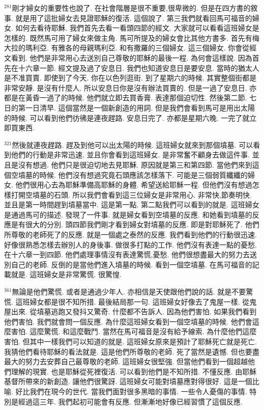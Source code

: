 \documentclass{book}
\begin{document}
$^{281}$剛才婦女的重要性也說了.
在社會階層是很不重要,很卑微的.
但是在四方書的敘事.
就是用了這批婦女去見證耶穌的復活.
這個說了.
第三我們就看回馬可福音的婦女.
如何去看待耶穌.
我們首先去看一看頭四節的經文.
大家就可以看看這班婦女是怎樣的.
既然馬可用了婦女來做主角.
馬可所提及的婦女會比其他方書多.
首先有梅大拉的瑪利亞.
有雅各的母親瑪利亞.
和有撒羅的三個婦女.
這三個婦女.
你會從經文看到.
他們是非常用心去送別自己尊敬的耶穌的最後一程.
為何會這樣說.
因為首先在十六章一節.
經文提及過了安息日.
我們也知道安息日是要安息.
當時的猶太人是不准買賣.
即使到了今天.
你在以色列逛街.
到了星期六的時候.
其實整個街都是非常安靜.
是沒有什麼人.
所以安息日你是沒有辦法買賣的.
但是一過了安息日.
亦都是在黃昏一過了的時候.
他們就立即去買香膏.
表達那個迫切性.
然後第二節.
七日的第一日清早.
這個當然是一個新創造的用詞.
但是我們會看到馬可是用出太陽的時候.
可以看到他們彷彿是連夜趕路.
安息日完了.
亦都是星期六晚.
一完了就立即買東西.

$^{321}$然後就連夜趕路.
趕及到他可以出太陽的時候.
這班婦女就來到那個墳墓.
可以看到他們的行動是非常迅速.
並且你會看到這班婦女.
是非常奮不顧身去做這件事.
並且是沒有想過.
他們只是很迫切地去見耶穌.
原因就是第三和第四節.
當他們來到這個空墳墓的時候.
他們沒有想過究竟石頭應該怎樣落下.
可能是三個弱質纖纖的婦女.
他們很用心去為耶穌準備高耶穌的身體.
希望送給耶穌一程.
但他們沒有想過怎樣打開空墳墓的石頭.
所以我們會看到這三位婦女是非常用心.
非常快,節奏明快.
並且是第一時間趕到墳墓當中.
這是第一點.
第二點我們可以看到的就是.
這班婦女是通過馬可的描述.
發現了一件事.
就是婦女看到空墳墓的反應.
和她看到墳墓的反應是有很大的分別.
頭四節我們剛才看到婦女對墳墓的反應.
即是對耶穌死了.
他們所尊敬的老師死了的反應.
就是一個處之泰然的反應.
我們看到他們的行動很迅速.
好像很熟悉怎樣去辦別人的身後事.
做很多打點的工作.
他們沒有表達一點的憂愁.
在十六章一到四節.
他們處理事情沒有表達驚慌,憂愁.
他們很想盡最大的努力去送別自己的老師.
反倒的是當他們進入墳墓的時候.
看到一個空墳墓.
在馬可福音的記載就是.
這班婦女是非常驚慌.
很驚惶.

$^{361}$無論是他們驚慌.
或者是通過少年人.
亦相信是天使跟他們說的話.
就是不要驚慌.
這班婦女都是很不知所措.
最後結局那一句.
這班婦女好像去了鬼屋一樣.
從鬼屋出來.
從墳墓逃跑又發抖又驚奇.
什麼都不告訴人.
因為他們害怕.
如果我們看到他們害怕.
我們就會問一個反應.
為什麼這班婦女看到一個空墳墓的時候.
他們會這麼害怕.
這麼驚慌.
和這麼戰鬥.
當然在馬可福音是沒有給予線索.
為什麼他們這麼害怕.
但其中一樣我們可以知道的就是.
這班婦女原來是預計了耶穌死亡就是死亡.
我猜他們看待耶穌的看法就是.
這是他們所尊敬的老師.
死了當然是遺憾.
但也要盡最大的努力去安葬自己最尊敬的老師.
這班婦女很堅強.
但當他們看到一個超越他們理解的現實.
也是耶穌從死裡復活.
可以看到他們是不知所措.
不懂反應.
由耶穌基督所帶來的新創造.
讓他們很驚訝.
這班婦女可能對墳墓應對得很好.
這是一個比喻.
好比我們在現今的世代.
當我們面對很多黑暗的事情.
一些令人憂傷的事情.
特別是經過這三年.
我們起初可能會有反應.
但漸漸地好像已經習慣了這個反應.
\end{document}
